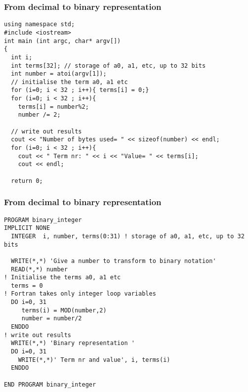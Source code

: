 \documentclass{beamer}
\newenvironment{block_mdfboxadmon}[1][]{\begin{block}{#1}}{\end{block}}
\begin{document}
\begin{frame}
\frametitle{From decimal to binary representation}

\begin{block_mdfboxadmon}
\begin{verbatim}
using namespace std;
#include <iostream>
int main (int argc, char* argv[])
{
  int i;
  int terms[32]; // storage of a0, a1, etc, up to 32 bits
  int number = atoi(argv[1]);
  // initialise the term a0, a1 etc
  for (i=0; i < 32 ; i++){ terms[i] = 0;}
  for (i=0; i < 32 ; i++){
    terms[i] = number%2;
    number /= 2;

  // write out results
  cout << "Number of bytes used= " << sizeof(number) << endl;
  for (i=0; i < 32 ; i++){
    cout << " Term nr: " << i << "Value= " << terms[i];
    cout << endl;

  return 0;

\end{verbatim}
\end{block_mdfboxadmon}
\end{frame}

\begin{frame}
\frametitle{From decimal to binary representation}

\begin{block_mdfboxadmon}
\begin{verbatim}
PROGRAM binary_integer
IMPLICIT NONE
  INTEGER  i, number, terms(0:31) ! storage of a0, a1, etc, up to 32 bits

  WRITE(*,*) 'Give a number to transform to binary notation'
  READ(*,*) number
! Initialise the terms a0, a1 etc
  terms = 0
! Fortran takes only integer loop variables
  DO i=0, 31
     terms(i) = MOD(number,2)
     number = number/2
  ENDDO
! write out results
  WRITE(*,*) 'Binary representation '
  DO i=0, 31
    WRITE(*,*)' Term nr and value', i, terms(i)
  ENDDO

END PROGRAM binary_integer
\end{verbatim}
\end{block_mdfboxadmon}
\end{frame}
\end{document}
